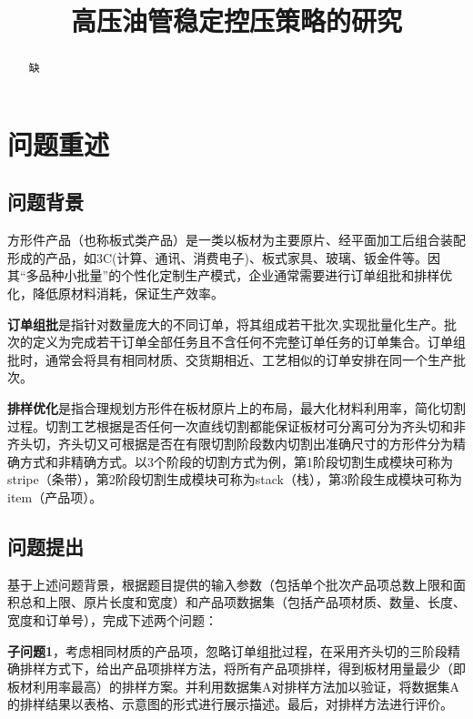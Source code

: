 \documentclass[bwprint]{gmcmthesis}
\title{高压油管稳定控压策略的研究}
\begin{document}
\sloppy

 \maketitle

\begin{abstract}
缺
\end{abstract}


\section{问题重述}
\subsection{问题背景}

方形件产品（也称板式类产品）是一类以板材为主要原片、经平面加工后组合装配形成的产品，如3C(计算、通讯、消费电子)、板式家具、玻璃、钣金件等。因其“多品种小批量”的个性化定制生产模式，企业通常需要进行订单组批和排样优化，降低原材料消耗，保证生产效率。

\textbf{订单组批}是指针对数量庞大的不同订单，将其组成若干批次,实现批量化生产。批次的定义为完成若干订单全部任务且不含任何不完整订单任务的订单集合。订单组批时，通常会将具有相同材质、交货期相近、工艺相似的订单安排在同一个生产批次。

\textbf{排样优化}是指合理规划方形件在板材原片上的布局，最大化材料利用率，简化切割过程。切割工艺根据是否任何一次直线切割都能保证板材可分离可分为齐头切和非齐头切，齐头切又可根据是否在有限切割阶段数内切割出准确尺寸的方形件分为精确方式和非精确方式。以3个阶段的切割方式为例，第1阶段切割生成模块可称为stripe（条带），第2阶段切割生成模块可称为stack（栈），第3阶段生成模块可称为item（产品项）。

\quad
\subsection{问题提出}
基于上述问题背景，根据题目提供的输入参数（包括单个批次产品项总数上限和面积总和上限、原片长度和宽度）和产品项数据集（包括产品项材质、数量、长度、宽度和订单号），完成下述两个问题：

\textbf{子问题1}，考虑相同材质的产品项，忽略订单组批过程，在采用齐头切的三阶段精确排样方式下，给出产品项排样方法，将所有产品项排样，得到板材用量最少（即板材利用率最高）的排样方案。并利用数据集A对排样方法加以验证，将数据集A的排样结果以表格、示意图的形式进行展示描述。最后，对排样方法进行评价。
\end{document}
